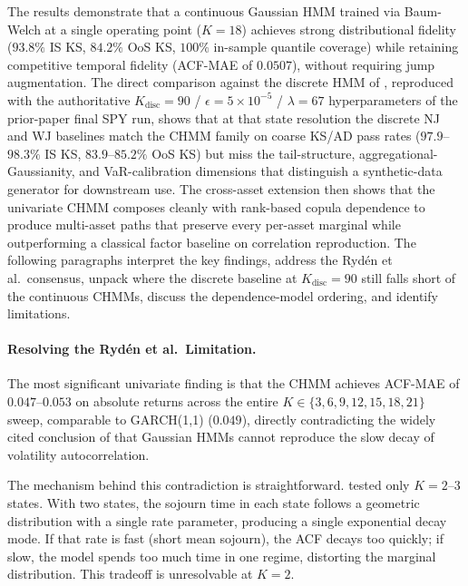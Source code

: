 The results demonstrate that a continuous Gaussian HMM trained via Baum-Welch at a single operating point ($K = 18$) achieves strong distributional fidelity ($93.8\%$ IS KS, $84.2\%$ OoS KS, $100\%$ in-sample quantile coverage) while retaining competitive temporal fidelity (ACF-MAE of $0.0507$), without requiring jump augmentation.
The direct comparison against the discrete HMM of \citet{alswaidan2026hybrid}, reproduced with the authoritative $K_{\text{disc}} = 90$ / $\epsilon = 5 \times 10^{-5}$ / $\lambda = 67$ hyperparameters of the prior-paper final SPY run, shows that at that state resolution the discrete NJ and WJ baselines match the CHMM family on coarse KS/AD pass rates ($97.9$--$98.3\%$ IS KS, $83.9$--$85.2\%$ OoS KS) but miss the tail-structure, aggregational-Gaussianity, and VaR-calibration dimensions that distinguish a synthetic-data generator for downstream use.
The cross-asset extension then shows that the univariate CHMM composes cleanly with rank-based copula dependence to produce multi-asset paths that preserve every per-asset marginal while outperforming a classical factor baseline on correlation reproduction.
The following paragraphs interpret the key findings, address the Ryd\'{e}n et al.\ consensus, unpack where the discrete baseline at $K_{\text{disc}} = 90$ still falls short of the continuous CHMMs, discuss the dependence-model ordering, and identify limitations.

\paragraph{Resolving the Ryd\'{e}n et al.\ Limitation.}
The most significant univariate finding is that the CHMM achieves ACF-MAE of $0.047$--$0.053$ on absolute returns across the entire $K \in \{3, 6, 9, 12, 15, 18, 21\}$ sweep, comparable to GARCH(1,1) ($0.049$), directly contradicting the widely cited conclusion of \citet{ryden1998stylized} that Gaussian HMMs cannot reproduce the slow decay of volatility autocorrelation.

The mechanism behind this contradiction is straightforward.
\citet{ryden1998stylized} tested only $K = 2$--$3$ states.
With two states, the sojourn time in each state follows a geometric distribution with a single rate parameter, producing a single exponential decay mode.
If that rate is fast (short mean sojourn), the ACF decays too quickly; if slow, the model spends too much time in one regime, distorting the marginal distribution.
This tradeoff is unresolvable at $K = 2$.

